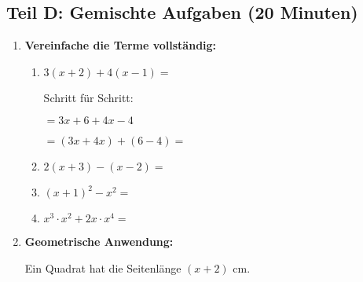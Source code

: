 \subsection*{Teil D: Gemischte Aufgaben (20 Minuten)}

\begin{enumerate}[label=\arabic*., resume]

    \item \textbf{Vereinfache die Terme vollständig:}

    \vspace{0.5cm}

    \begin{enumerate}[label=\alph*)]
        \item $3(x + 2) + 4(x - 1) = $ \underline{\hspace{6cm}}

        \vspace{0.5cm}
        Schritt für Schritt:
        \vspace{0.3cm}

        $= 3x + 6 + 4x - 4$
        \vspace{0.3cm}

        $= (3x + 4x) + (6 - 4) = $ \underline{\hspace{3cm}}

        \vspace{0.5cm}

        \item $2(x + 3) - (x - 2) = $ \underline{\hspace{6cm}}
        \vspace{1cm}

        \item $(x + 1)^2 - x^2 = $ \underline{\hspace{6cm}}
        \vspace{1cm}

        \item $x^3 \cdot x^2 + 2x \cdot x^4 = $ \underline{\hspace{6cm}}
    \end{enumerate}

    \vspace{1cm}

    \item \textbf{Geometrische Anwendung:}

    Ein Quadrat hat die Seitenlänge $(x + 2)$ cm.

    \vspace{0.5cm}


\end{enumerate}
